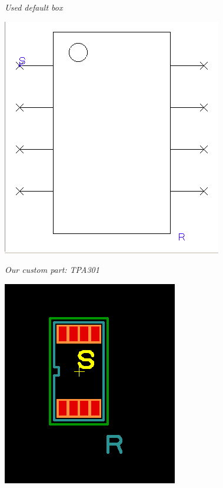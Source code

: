 \documentclass[twoside]{article}
\begin{document}
\emph{Used default box}\\
\centerline{\includegraphics[width=\textwidth]{Foot}}
\emph{Our custom part: TPA301}\\
\centerline{\includegraphics[width=\textwidth]{Foot2}}
\end{document}
